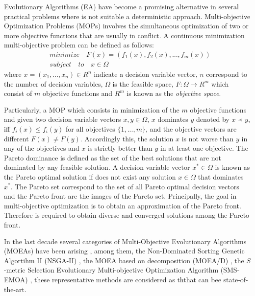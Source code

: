 Evolutionary Algorithms (EA) have become a promising alternative in several practical problems where is not suitable a deterministic approach.
%
Multi-objective Optimization Problems (MOPs) involves the simultaneous optimization of two or more objective functions that are usually in conflict.
%
A continuous minimization multi-objective problem can be defined as follows:
%
\begin{equation}\label{Base}
\begin{split}
&minimize \quad F(x) = (f_1(x), f_2(x), ..., f_m(x)) \\
&subject \quad to \quad x \in \Omega
\end{split}
\end{equation}
where $x = (x_1, ..., x_n) \in R^n$ indicate a decision variable vector, $n$ correspond to the number of decision variables, $\Omega$ is the feasible space, $F: \Omega \rightarrow R^m$ which consist of $m$ objective functions and $R^m$ is known as the \textit{objective space}.
%

Particularly, a MOP which consists in minimization of the $m$ objective functions and given two decision variable vectors $x, y \in \Omega$, $x$ dominates $y$ denoted by $x \prec y$, iff $f_i(x)  \leq f_i(y)$ for all objectives $\{1,...,m\}$, and the objective vectors are different $F(x) \neq F(y)$.
%
Accordingly this, the solution $x$ is not worse than $y$ in any of the objectives and $x$ is strictly better than $y$ in at least one objective.
%
The Pareto dominance is defined as the set of the best solutions that are not dominated by any feasible solution.
%
A decision variable vector $x^* \in \Omega$ is known as the Pareto optimal solution if does not exist any solution $x \in \Omega$ that dominates $x^*$.
%
The Pareto set correspond to the set of all Pareto optimal decision vectors and the Pareto front are the images of the Pareto set.
%
Principally, the goal in multi-objective optimization is to obtain an approximation of the Pareto front.
%
Therefore is required to obtain diverse and converged solutions among the Pareto front.
%

In the last decade several categories of Multi-Objective Evolutionary Algorithms (MOEAs) have been arising \cite{Joel:Kalyanmoy,Joel:Coello}, among them, the Non-Dominated Sorting Genetic Algortihm II (NSGA-II) \cite{Joel:NSGAII}, the MOEA based on decomposition (MOEA/D) \cite{Joel:MOEAD}, the $S$-metric Selection Evolutionary Multi-objective Optimization Algorithm (SMS-EMOA) \cite{Joel:SMSEMOA}, these representative methods are considered as ththat can bee state-of-the-art.


